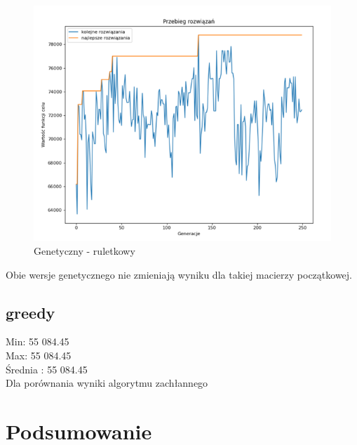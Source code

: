 \documentclass{article}
\begin{document}
\begin{figure}[H]
	\centering
	\includegraphics[width=0.7\linewidth]{screens/genetic_roulet_zlych_przypadkow}
	\caption{Genetyczny - ruletkowy}
	\label{fig:geneticrouletzlychprzypadkow}
\end{figure}

Obie wersje genetycznego nie zmieniają wyniku dla takiej macierzy początkowej.


\subsection{greedy}

Min: 55 084.45\\
Max: 55 084.45\\
Średnia : 55 084.45\\

Dla porównania wyniki algorytmu zachłannego




\section{Podsumowanie}
\end{document}
